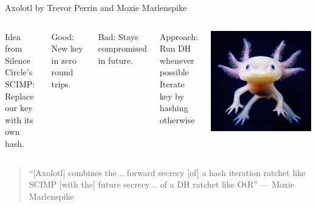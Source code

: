 \documentclass[fleqn,xcolor={usenames,dvipsnames}]{beamer}
\begin{document}
\begin{frame}{Axolotl by Trevor Perrin and Moxie Marlenspike}
\begin{columns}[T]

Idea from Silence Circle's SCIMP: \\
\hspace*{2pt} Replace our key with its own hash.

\medskip

Good: New key in zero round trips.

\smallskip

Bad: Stays compromised in future.

\bigskip

Approach: \\
\hspace*{2pt} Run DH whenever possible \\
\hspace*{2pt} Iterate key by hashing otherwise 

% 

\includegraphics[width=\textwidth]{../pics/axolotl_animal-1.jpg}
\end{columns}

\medskip

\begin{quote}
``[Axolotl] combines the .. forward secrecy [of] a hash iteration ratchet like SCIMP [with the] future secrecy .. of a DH ratchet like OtR'' %
\hfill --- Moxie Marlenspike %
\end{quote}
\end{frame}
\end{document}

